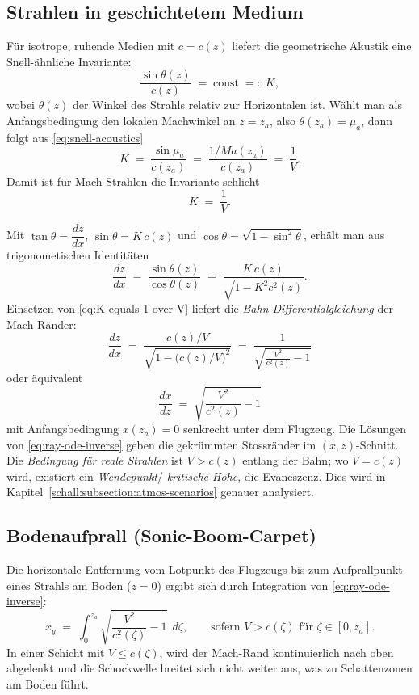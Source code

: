 \subsection{Strahlen in geschichtetem Medium}
Für isotrope, ruhende Medien mit $c=c(z)$ liefert die geometrische
Akustik eine Snell-ähnliche Invariante:
\begin{equation}
    \frac{\sin\theta(z)}{c(z)} \;=\; \text{const} \;=:\; K ,
    \label{eq:snell-acoustics}
\end{equation}
wobei $\theta(z)$ der Winkel des Strahls relativ zur Horizontalen ist.
Wählt man als Anfangsbedingung den lokalen Machwinkel an $z=z_a$,
also $\theta(z_a)=\mu_a$, dann folgt aus \eqref{eq:snell-acoustics}
\[
    K \;=\; \frac{\sin\mu_a}{c(z_a)} \;=\; \frac{1/\textit{Ma}(z_a)}{c(z_a)} \;=\; \frac{1}{V}.
\]
Damit ist für Mach-Strahlen die Invariante schlicht
\begin{equation}
    K \;=\; \frac{1}{V}.
    \label{eq:K-equals-1-over-V}
\end{equation}

Mit $\tan\theta = \dfrac{dz}{dx}$, $\sin\theta = K\,c(z)$ und
$\cos\theta = \sqrt{1 - \sin^2\theta}$,
erhält man aus trigonometischen Identitäten
\begin{equation}
    \frac{dz}{dx} \;=\; \frac{\sin\theta(z)}{\cos\theta(z)} \;=\;
    \frac{K\,c(z)}{\sqrt{1 - K^2 c^2(z)}}.
\end{equation}
Einsetzen von \eqref{eq:K-equals-1-over-V} liefert die
\emph{Bahn-Differentialgleichung} der Mach-Ränder:
\[
    \quad
    \frac{dz}{dx} \;=\; \frac{c(z)/V}{\sqrt{1 - \big(c(z)/V\big)^2}}
    \;=\; \frac{1}{\sqrt{\frac{V^2}{c^2(z)} - 1}}
    \quad
\]
oder äquivalent
\begin{equation}
    \quad
    \frac{dx}{dz} \;=\; \sqrt{\frac{V^2}{c^2(z)} - 1}
    \quad
    \label{eq:ray-ode-inverse}
\end{equation}
mit Anfangsbedingung $x(z_a)=0$ senkrecht unter dem Flugzeug.
Die Lösungen von \eqref{eq:ray-ode-inverse} geben die gekrümmten Stossränder
im $(x,z)$-Schnitt.
Die \emph{Bedingung für reale Strahlen} ist $V>c(z)$ entlang der Bahn;
wo $V=c(z)$ wird, existiert ein \emph{Wendepunkt}/
\emph{kritische Höhe}, die Evaneszenz.
Dies wird in Kapitel~\ref{schall:subsection:atmos-scenarios} genauer analysiert.

\subsection{Bodenaufprall (Sonic-Boom-Carpet)}
Die horizontale Entfernung vom Lotpunkt des Flugzeugs bis zum
Aufprallpunkt eines Strahls am Boden ($z=0$) ergibt sich durch
Integration von \eqref{eq:ray-ode-inverse}:
\begin{equation}
    \quad
    x_g \;=\; \int_{0}^{z_a} \sqrt{\frac{V^2}{c^2(\zeta)} - 1}\;\, d\zeta,
    \qquad \text{sofern } V>c(\zeta) \text{ für } \zeta\in[0,z_a].
    \quad
    \label{eq:ground-range}
\end{equation}
In einer Schicht mit $V\le c(\zeta)$, wird der Mach-Rand kontinuierlich
nach oben abgelenkt und die Schockwelle breitet sich nicht weiter aus,
was zu Schattenzonen am Boden führt.

